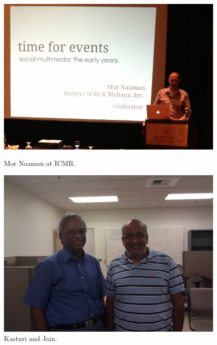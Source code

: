 \begin{figure}[t]
\begin{minipage}[b]{0.48\linewidth}
\centering
\includegraphics[width=\textwidth]{media/chapter2/naaman.jpg}
\caption{Mor Naaman at ICMR.}
\label{fig:naaman-icmr}
\end{minipage}
\hspace{0.5cm}
\begin{minipage}[b]{0.45\linewidth}
\centering
\includegraphics[width=\textwidth]{media/chapter1/kasturi-show.jpg}
\caption{Kasturi and Jain.}
\label{fig:example-kasturi-show}
\end{minipage}
\end{figure}

